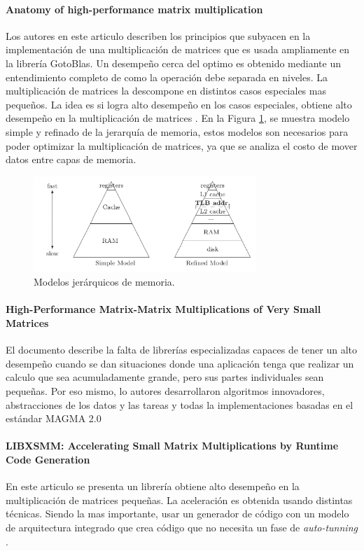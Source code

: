 \paragraph{Anatomy of high-performance matrix multiplication}
Los autores en este articulo describen los principios que subyacen en la implementación de una multiplicación de matrices que es usada ampliamente en la librería GotoBlas.
Un desempeño cerca del optimo es obtenido mediante un entendimiento completo de como la operación debe separada en niveles.
La multiplicación de matrices la descompone en distintos casos especiales mas pequeños.
 La idea es si logra alto desempeño en los casos especiales, obtiene alto desempeño en la multiplicación de matrices
\cite{Goto2008}.
En la Figura \ref{fig:hmem}, se muestra modelo simple y refinado de la jerarquía de memoria, estos modelos son necesarios para poder optimizar la multiplicación  de matrices, ya que se analiza el costo de mover datos entre capas de memoria.

\begin{figure}[H]
    \centering
    \includegraphics[width=0.75\textwidth]{imagenes/image10.png}
    \caption{Modelos jerárquicos de memoria.}
    \label{fig:hmem}
\end{figure}

\paragraph{High-Performance Matrix-Matrix Multiplications of Very Small Matrices}
El documento describe la falta de librerías especializadas capaces de tener un alto desempeño cuando se dan situaciones donde una aplicación tenga que realizar un calculo que sea acumuladamente grande, pero sus partes individuales sean pequeñas.
Por eso mismo, lo autores desarrollaron algoritmos innovadores, abstracciones de los datos y las tareas y todas la implementaciones basadas en el estándar  MAGMA 2.0
\cite{Masliah2016}


\paragraph{LIBXSMM: Accelerating Small Matrix Multiplications by Runtime Code Generation}
En este articulo se presenta un librería obtiene alto desempeño en la multiplicación de matrices pequeñas.
La aceleración es obtenida usando distintas técnicas. Siendo la mas importante, usar un generador de código con un modelo de arquitectura integrado que crea código que no necesita un fase de \emph{auto-tunning}
\cite{Heinecke2016}.




